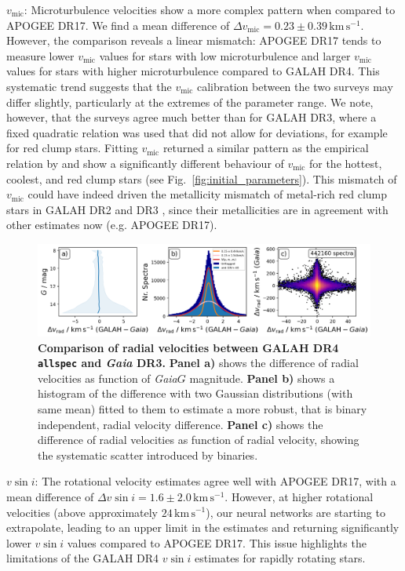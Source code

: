\documentclass[
  journal=pasa,
  manuscript=research-paper, %
  year=2024,
  volume=37
]{cup-journal}
\newcommand{\vmic}{$v_\mathrm{mic}$\xspace}
\newcommand{\vsini}{$v \sin i$\xspace}
\newcommand{\Gaia}{\textit{Gaia}\xspace}
\begin{document}
\vmic: Microturbulence velocities show a more complex pattern when compared to APOGEE DR17. We find a mean difference of $\Delta v_\mathrm{mic} = 0.23 \pm 0.39\,\mathrm{km\,s^{-1}}$. However, the comparison reveals a linear mismatch: APOGEE DR17 tends to measure lower \vmic values for stars with low microturbulence and larger \vmic values for stars with higher microturbulence compared to GALAH DR4. This systematic trend suggests that the \vmic calibration between the two surveys may differ slightly, particularly at the extremes of the parameter range. We note, however, that the surveys agree much better than for GALAH DR3, where a fixed quadratic relation was used that did not allow for deviations, for example for red clump stars. Fitting \vmic returned a similar pattern as the empirical relation by \citet{DutraFerreira2016} and show a significantly different behaviour of \vmic for the hottest, coolest, and red clump stars (see Fig.~\ref{fig:initial_parameters}). This mismatch of \vmic could have indeed driven the metallicity mismatch of metal-rich red clump stars in GALAH DR2 and DR3 \citep{Buder2018, Buder2021}, since their metallicities are in agreement with other estimates now (e.g. APOGEE DR17).

\begin{figure}[ht]
 \centering
 \includegraphics[width=\textwidth]{figures/galah_dr4_vrad_gaia_dr3.png}
 \caption{\textbf{Comparison of radial velocities between GALAH DR4 \texttt{allspec} and \Gaia DR3.}
 \textbf{Panel a)} shows the difference of radial velocities as function of \Gaia $G$ magnitude.
 \textbf{Panel b)} shows a histogram of the difference with two Gaussian distributions (with same mean) fitted to them to estimate a more robust, that is binary independent, radial velocity difference.
 \textbf{Panel c)} shows the difference of radial velocities as function of radial velocity, showing the systematic scatter introduced by binaries.
}
 \label{fig:galah_dr4_vrad_gaia_dr3}
\end{figure}

\vsini: The rotational velocity estimates agree well with APOGEE DR17, with a mean difference of $\Delta v \sin i = 1.6 \pm 2.0\,\mathrm{km\,s^{-1}}$. However, at higher rotational velocities (above approximately $24\,\mathrm{km\,s^{-1}}$), our neural networks are starting to extrapolate, leading to an upper limit in the estimates and returning significantly lower \vsini values compared to APOGEE DR17. This issue highlights the limitations of the GALAH DR4 \vsini estimates for rapidly rotating stars.
\end{document}
